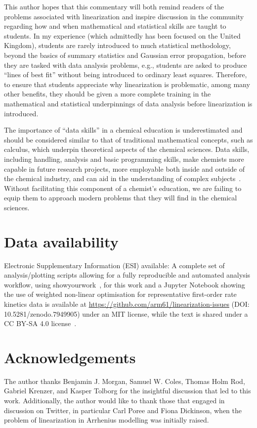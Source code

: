 \documentclass[journal=jceda8,manuscript=article]{achemso}
\begin{document}
This author hopes that this commentary will both remind readers of the problems associated with linearization and inspire discussion in the community regarding how and when mathematical and statistical skills are taught to students. 
In my experience (which admittedly has been focused on the United Kingdom), students are rarely introduced to much statistical methodology, beyond the basics of summary statistics and Gaussian error propagation, before they are tasked with data analysis problems, e.g., students are asked to produce ``lines of best fit'' without being introduced to ordinary least squares.
Therefore, to ensure that students appreciate why linearization is problematic, among many other benefits, they should be given a more complete training in the mathematical and statistical underpinnings of data analysis before linearization is introduced.

The importance of ``data skills'' in a chemical education is underestimated and should be considered similar to that of traditional mathematical concepts, such as calculus, which underpin theoretical aspects of the chemical sciences.
Data skills, including handling, analysis and basic programming skills, make chemists more capable in future research projects, more employable both inside and outside of the chemical industry, and can aid in the understanding of complex subjects~\cite{srnec_python_2017,chng_building_2020,dicksonkarn_implementation_2021,cumby_course_2023}.
Without facilitating this component of a chemist's education, we are failing to equip them to approach modern problems that they will find in the chemical sciences. 

\section*{Data availability}

Electronic Supplementary Information (ESI) available: A complete set of analysis/plotting scripts allowing for a fully reproducible and automated analysis workflow, using showyourwork~\cite{luger_showyourwork_2021}, for this work and a Jupyter Notebook showing the use of weighted non-linear optimisation for representative first-order rate kinetics data is available at \url{https://github.com/arm61/linearization-issues} (DOI: 10.5281/zenodo.7949905) under an MIT license, while the text is shared under a CC BY-SA 4.0 license~\cite{mccluskey_github_2023}.

\section*{Acknowledgements}

The author thanks Benjamin J. Morgan, Samuel W. Coles, Thomas Holm Rod, Gabriel Krenzer, and Kasper Tolborg for the insightful discussion that led to this work. 
Additionally, the author would like to thank those that engaged in discussion on Twitter, in particular Carl Poree and Fiona Dickinson, when the problem of linearization in Arrhenius modelling was initially raised. 


\end{document}
